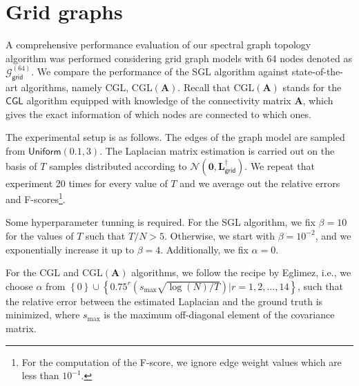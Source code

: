 \section{Grid graphs}
A comprehensive performance evaluation of our spectral graph topology algorithm was
performed considering grid graph models with 64 nodes denoted as
$\mathcal{G}^{(64)}_{\mathsf{grid}}$.
We compare the performance of the \textsf{SGL} algorithm against state-of-the-art algorithms, namely
\textsf{CGL}, \textsf{CGL}$(\mathbf{A})$. Recall that \textsf{CGL}$(\mathbf{A})$ stands for the
$\textsf{CGL}$ algorithm equipped with knowledge of the connectivity matrix $\mathbf{A}$, which gives
the exact information of which nodes are connected to which ones.

The experimental setup is as follows. The edges of the graph model are sampled from $\mathsf{Uniform}(0.1, 3)$.
The Laplacian matrix estimation is carried out on the basis of $T$ samples distributed according to
$\mathcal{N}(\mathbf{0}, \mathbf{L}_{\mathsf{grid}}^{\dagger})$. We repeat that experiment 20 times
for every value of $T$ and we average out the relative errors and F-scores\footnote{For the computation of the
F-score, we ignore edge weight values which are less than $10^{-1}$.}.

Some hyperparameter tunning is required. For the \textsf{SGL} algorithm, we fix
$\beta = 10$ for the values of $T$ such that $T / N > 5$. Otherwise, we start with
$\beta = 10^{-2}$, and we exponentially increase it up to $\beta = 4$.
Additionally, we fix $\alpha = 0$.

For the \textsf{CGL} and \textsf{CGL}$(\mathbf{A})$ algorithms, we follow the recipe by
Eglimez, i.e., we choose $\alpha$ from $\left\{0\right\}\cup\left\{0.75^{r}\left(s_{\text{max}}
\sqrt{\log(N) / T}\right) | r = 1, 2, ..., 14\right\}$, such that the relative error between
the estimated Laplacian and the ground truth is minimized, where $s_{\text{max}}$ is the
maximum off-diagonal element of the covariance matrix.

